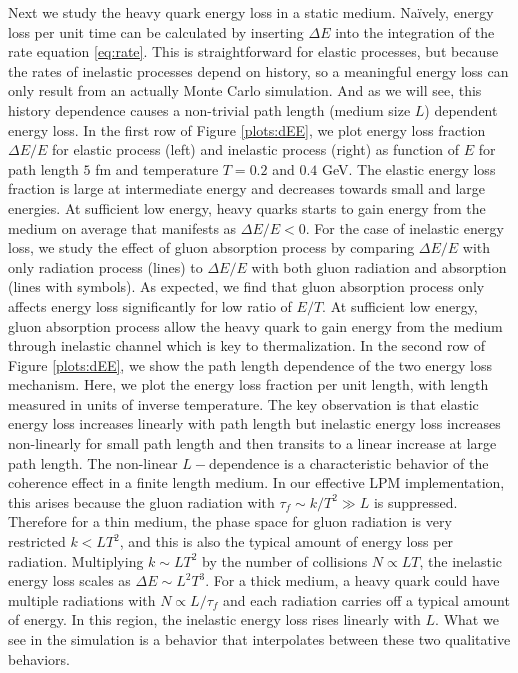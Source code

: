\documentclass[aps, prc, reprint, amsmath, groupedaddress, nofootinbib]{revtex4-1}
\begin{document}
Next we study the heavy quark energy loss in a static medium.
Na\"ively, energy loss per unit time can be calculated by inserting $\Delta E$ into the integration of the rate equation \ref{eq:rate}. 
This is straightforward for elastic processes, but because the rates of inelastic processes depend on history, so a meaningful energy loss can only result from an actually Monte Carlo simulation.
And as we will see, this history dependence causes a non-trivial path length (medium size $L$) dependent energy loss.
In the first row of Figure \ref{plots:dEE}, we plot energy loss fraction $\Delta E/E$ for elastic process (left) and inelastic process (right) as function of $E$ for path length $5$ fm and temperature $T=0.2$ and $0.4$  GeV.
The elastic energy loss fraction is large at intermediate energy and decreases towards small and large energies.
At sufficient low energy, heavy quarks starts to gain energy from the medium on average that manifests as $\Delta E/E < 0$.
For the case of inelastic energy loss, we study the effect of gluon absorption process by comparing $\Delta E/E$ with only radiation process (lines) to $\Delta E/E$ with both gluon radiation and absorption (lines with symbols).
As expected, we find that gluon absorption process only affects energy loss significantly for low ratio of $E/T$.
At sufficient low energy, gluon absorption process allow the heavy quark to gain energy from the medium through inelastic channel which is key to thermalization.
In the second row of Figure \ref{plots:dEE}, we show the path length dependence of the two energy loss mechanism.
Here, we plot the energy loss fraction per unit length, with length measured in units of inverse temperature.
The key observation is that elastic energy loss increases linearly with path length but inelastic energy loss increases non-linearly for small path length and then transits to a linear increase at large path length. 
The non-linear $L-$dependence is a characteristic behavior of the coherence effect in a finite length medium. 
In our effective LPM implementation, this arises because the gluon radiation with $\tau_f \sim k/T^2 \gg L$ is suppressed.
Therefore for a thin medium, the phase space for gluon radiation is very restricted $k < LT^2$, and this is also the typical amount of energy loss per radiation.
Multiplying $k \sim LT^2$ by the number of collisions $N \propto LT$, the inelastic energy loss scales as $\Delta E \sim L^2T^3$.
For a thick medium, a heavy quark could have multiple radiations with $N \propto L/\tau_f$ and each radiation carries off a typical amount of energy. 
In this region, the inelastic energy loss rises linearly with $L$.
What we see in the simulation is a behavior that interpolates between these two qualitative behaviors.
\end{document}
